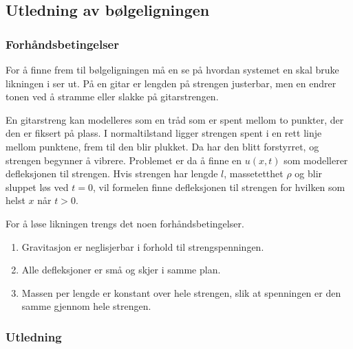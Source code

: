 \subsection{Utledning av bølgeligningen}
\subsubsection{Forhåndsbetingelser}
For å finne frem til bølgeligningen må en se på hvordan systemet en skal bruke likningen i ser ut.
På en gitar er lengden på strengen justerbar, men en endrer tonen ved å stramme eller slakke
på gitarstrengen.

En gitarstreng kan modelleres som en tråd som er spent mellom to punkter, der den er fiksert på plass.
I normaltilstand ligger strengen spent i en rett linje mellom punktene, frem til den blir plukket. Da
har den blitt forstyrret, og strengen begynner å vibrere. Problemet er da å finne en \(u(x,t)\) som modellerer
defleksjonen til strengen. Hvis strengen har lengde \(l\), massetetthet \(\rho\) og blir sluppet løs ved \(t=0\),
vil formelen finne defleksjonen til strengen for hvilken som helst \(x\) når \(t>0\).

For å løse likningen trengs det noen forhåndsbetingelser.

\begin{enumerate}
  \item Gravitasjon er neglisjerbar i forhold til strengspenningen.
  \item Alle defleksjoner er små og skjer i samme plan.
  \item Massen per lengde er konstant over hele strengen, slik at spenningen er den samme
  gjennom hele strengen.
\end{enumerate}

\subsubsection{Utledning}


